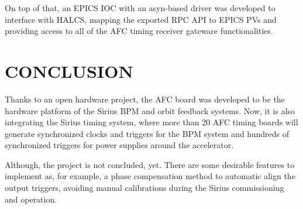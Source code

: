 \documentclass[a4paper,
               biblatex,      %
               ]{jacow}
\begin{document}
On top of that, an EPICS IOC with an asyn-based driver was developed to interface with HALCS, mapping the exported RPC API to EPICS PVs and providing access to all of the AFC timing receiver gateware functionalities.

\section{CONCLUSION}
Thanks to an open hardware project, the AFC board was developed to be the hardware platform of the Sirius BPM and orbit feedback systems. Now, it is also integrating the Sirius timing system, where more than 20 AFC timing boards will generate synchronized clocks and triggers for the BPM system and hundreds of synchronized triggers for power supplies around the accelerator.

Although, the project is not concluded, yet. There are some desirable features to implement as, for example, a phase compensation method to automatic align the output triggers, avoiding manual calibrations during the Sirius commissioning and operation. 

\printbibliography
\newpage
\end{document}
